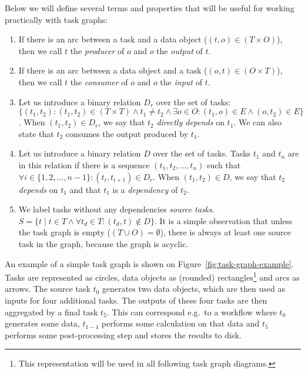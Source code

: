 Below we will define several terms and properties that will be useful for working practically with
task graphs:
\begin{enumerate}
    \item If there is an arc between a task and a data object ($(t,o) \in (T\times{}O)$), then we call
    $t$ the \emph{producer} of $o$ and $o$
    the \emph{output} of $t$.
    \item If there is an arc between a data object and a task ($(o,t) \in (O\times{}T)$), then we call
    $t$ the \emph{consumer} of $o$ and $o$
    the \emph{input} of $t$.

    \item Let us introduce a binary relation $D_r$ over the set of tasks:
    $\{(t_1, t_2): (t_1, t_2)\in{}(T\times{}T)\land t_1 \neq t_2 \land
    \exists{}o\in{}O: (t_1, o)\in{}E
    \land (o, t_2)\in{}E\}$. When $(t_1, t_2) \in D_r$, we say that $t_2$
    \emph{directly depends} on $t_1$. We can also state that $t_2$
    consumes the output produced by $t_1$.

    \item Let us introduce a binary relation $D$ over the set of tasks. Tasks
    $t_1$ and $t_n$ are in this relation if there is a sequence
    $(t_1, t_2, \ldots, t_n)$ such that $\forall i \in \{
    1,2,\ldots,n - 1\}: (t_i, t_{i+1}) \in D_r$. When $(t_1, t_2) \in D$, we say that
    $t_2$ \emph{depends} on $t_1$ and that
    $t_1$ is a \emph{dependency} of $t_2$.

    \item We label tasks without any dependencies \emph{source tasks}. $S = \{ t \mid t\in{}T \land \forall{}t_d\in{}T:
    (t_d, t)\notin D\}$. It is a
    simple observation that unless the task graph is empty ($(T\cup{}O) = \emptyset$), there is always at
    least one source task in the graph, because the graph is acyclic.
\end{enumerate}

An example of a simple task graph is shown on Figure~\ref{fig:task-graph-example}. Tasks are represented
as circles, data objects as (rounded) rectangles\footnote{This representation will be used in all following task graph diagrams.} and arcs as arrows. The
source task $t_0$ generates two data objects, which are then used as inputs for
four additional tasks. The outputs of these four tasks are then aggregated by a final task
$t_5$. This can correspond e.g.\ to a workflow where $t_0$
generates some data, $t_{1-4}$ performs some calculation on that data and
$t_5$ performs some post-processing step and stores the results to disk.

